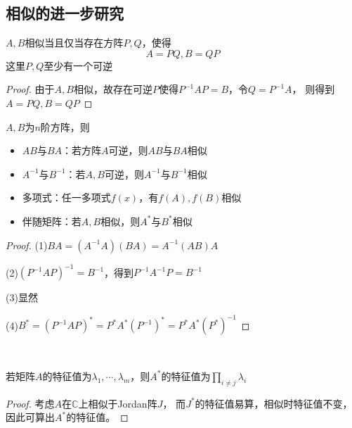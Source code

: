 \subsection{相似的进一步研究}

\begin{theorem}[相似的矩阵分解]
  $A,B$相似当且仅当存在方阵$P,Q$，使得
  \begin{equation*}
    A = PQ, B = QP
  \end{equation*}
  这里$P,Q$至少有一个可逆
\end{theorem}

\begin{proof}
  由于$A,B$相似，故存在可逆$P$使得$P^{-1}AP = B$，令$Q = P^{-1}A$，
  则得到$A = PQ, B = QP$
\end{proof}

\begin{theorem}[一些相似结论]
  $A,B$为$n$阶方阵，则
  \begin{itemize}
  \item $AB$与$BA$：若方阵$A$可逆，则$AB$与$BA$相似
  \item $A^{-1}$与$B^{-1}$：若$A,B$可逆，则$A^{-1}$与$B^{-1}$相似
  \item 多项式：任一多项式$f(x)$，有$f(A),f(B)$相似
  \item 伴随矩阵：若$A,B$相似，则$A^{\ast}$与$B^{\ast}$相似
  \end{itemize}
\end{theorem}

\begin{proof}
  (1)$BA = (A^{-1}A)(BA) = A^{-1}(AB)A$

  (2)$(P^{-1}AP)^{-1} = B^{-1}$，得到$P^{-1}A^{-1}P = B^{-1}$

  (3)显然

  (4)$B^{\ast} = (P^{-1}AP)^{\ast} = P^{\ast}A^{\ast}(P^{-1})^{\ast} = P^{\ast}A^{\ast}(P^{\ast})^{-1}$
\end{proof}

~

\begin{corollary}[伴随矩阵的特征值]
  若矩阵$A$的特征值为$\lambda_1,\cdots,\lambda_m$，则$A^{\ast}$的特征值为$\prod \limits _{i \neq j}\lambda_i$
\end{corollary}

\begin{proof}
  考虑$A$在$\mathbb{C}$上相似于Jordan阵$J$，
  而$J^{\ast}$的特征值易算，相似时特征值不变，因此可算出$A^{\ast}$的特征值。
\end{proof}


